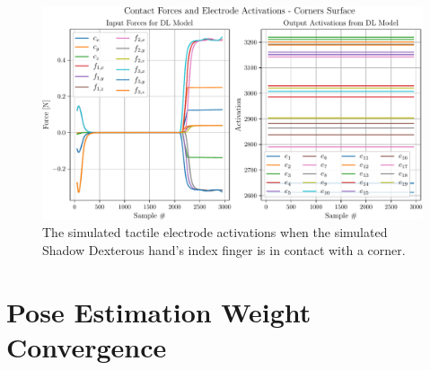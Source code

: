 \begin{figure}[!h]
	\begin{center}
		\includegraphics[width=\textwidth]{chapters/1-tactile-perception/fig/matplotlib/corners-contact-graph.pdf}
	\end{center}
	\caption{The simulated tactile electrode activations when the simulated Shadow Dexterous hand's index finger is in contact with a corner.}
	\label{app:corner-contact-graph}
\end{figure}

\chapter{Pose Estimation Weight Convergence}\label{app:pose-estimation-weight-convergence}

